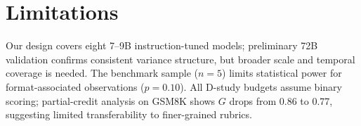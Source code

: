 \section{Limitations}
\label{sec:limitations}

Our design covers eight 7--9B instruction-tuned models; preliminary 72B validation confirms consistent variance structure, but broader scale and temporal coverage is needed. The benchmark sample ($n = 5$) limits statistical power for format-associated observations ($p = 0.10$). All D-study budgets assume binary scoring; partial-credit analysis on GSM8K shows $G$ drops from 0.86 to 0.77, suggesting limited transferability to finer-grained rubrics.
